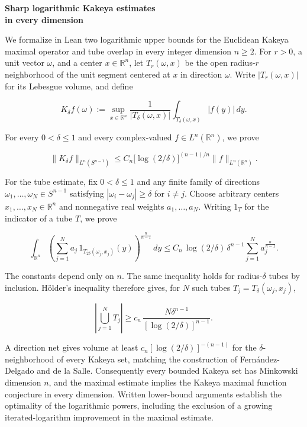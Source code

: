 \documentclass[11pt,letterpaper]{article}
\newcommand{\minorheading}[1]{\par\addvspace{7pt}\noindent{\normalsize\bfseries #1}\par\nobreak\vspace{2pt}}
\begin{document}
\begin{center}
{\Large\bfseries Sharp logarithmic Kakeya estimates\\[3pt] in every dimension}
\end{center}
\minorheading{Abstract}

We formalize in Lean two logarithmic upper bounds for the Euclidean Kakeya maximal operator and tube overlap in every integer dimension $n\ge2$.
For $r>0$, a unit vector $\omega$, and a center $x\in\mathbb R^n$, let $T_r(\omega,x)$ be the open radius-$r$ neighborhood of the unit segment centered at $x$ in direction $\omega$.
Write $|T_r(\omega,x)|$ for its Lebesgue volume, and define

\[
K_\delta f(\omega)
:=\sup_{x\in\mathbb R^n}
\frac{1}{|T_\delta(\omega,x)|}
\int_{T_\delta(\omega,x)} |f(y)|\,dy.
\]

For every $0<\delta\le1$ and every complex-valued $f\in L^n(\mathbb R^n)$, we prove

\[
\|K_\delta f\|_{L^n(S^{n-1})}
\le C_n\bigl[\log(2/\delta)\bigr]^{(n-1)/n}
\|f\|_{L^n(\mathbb R^n)}.
\]

For the tube estimate, fix $0<\delta\le1$ and any finite family of directions $\omega_1,\ldots,\omega_N\in S^{n-1}$ satisfying $|\omega_i-\omega_j|\ge\delta$ for $i\ne j$.
Choose arbitrary centers $x_1,\ldots,x_N\in\mathbb R^n$ and nonnegative real weights $a_1,\ldots,a_N$.
Writing $1_T$ for the indicator of a tube $T$, we prove

\[
\int_{\mathbb R^n}
\left(\sum_{j=1}^{N} a_j\,1_{T_{2\delta}(\omega_j,x_j)}(y)\right)^{\!\frac{n}{n-1}}
\,dy
\le
C_n\,\log(2/\delta)\,\delta^{n-1}
\sum_{j=1}^{N} a_j^{\frac{n}{n-1}}.
\]

The constants depend only on $n$.
The same inequality holds for radius-$\delta$ tubes by inclusion.
Hölder's inequality therefore gives, for $N$ such tubes $T_j=T_\delta(\omega_j,x_j)$,

\[
\left|\bigcup_{j=1}^{N}T_j\right|
\ge c_n\,\frac{N\delta^{n-1}}{[\log(2/\delta)]^{n-1}}.
\]

A direction net gives volume at least $c_n[\log(2/\delta)]^{-(n-1)}$ for the $\delta$-neighborhood of every Kakeya set, matching the construction of Fernández-Delgado and de la Salle.
Consequently every bounded Kakeya set has Minkowski dimension $n$, and the maximal estimate implies the Kakeya maximal function conjecture in every dimension.
Written lower-bound arguments establish the optimality of the logarithmic powers, including the exclusion of a growing iterated-logarithm improvement in the maximal estimate.
\end{document}
